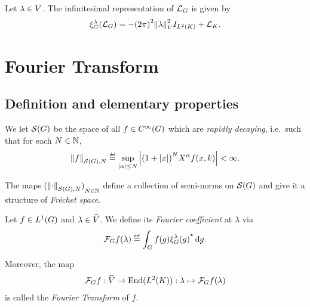 \begin{corollary}
\label{corollary:infinitesimal_representation_of_the_Laplacian}
    Let $\lambda \in \VectorSpace$.
    The infinitesimal representation of $\Laplacian$ is given by
    \begin{align*}
        \Rep{\lambda}(\Laplacian) = - {(\turn)}^2 \norm{\lambda}^2 \Id{\Lebesgue{2}{\CompactGroup}} + \Laplacian[\CompactGroup].
    \end{align*}
\end{corollary}

\section{Fourier Transform}

\subsection{Definition and elementary properties}

\begin{definition}
    We let $\Schwartz\Group$ be the space of all $f \in \SmoothFunctions\Group$
    which are \emph{rapidly decaying},
    i.e.\ such that for each $N \in \N$,
    \begin{align*}
        \seminorm[\Schwartz\Group]{N}{f} \defeq
        \sup_{\abs\alpha \leq N}
        \abs{%
            {(1 + \abs{x})}^N
            \LeftDifferentialOperator{\alpha} f(x, k)
        }
        < \infty.
    \end{align*}

    The maps ${(\seminorm[\Schwartz\Group]{N}{\dummy})}_{N \in \N}$ define a collection of semi-norms on $\Schwartz\Group$
    and give it a structure of \emph{Fr\'echet space}.
\end{definition}

\begin{definition}
\label{definition:Fourier_Transform}
    Let $f \in \Lebesgue{1}{\Group}$ and $\lambda \in \dualGroup{\VectorSpace}$.
    We define its \emph{Fourier coefficient} at $\lambda$ via
    \begin{align*}
        \Fourier{f}(\lambda) \defeq \int_\Group f(g) \adj{\Rep{\lambda}(g)} \dd g.
    \end{align*}

    Moreover, the map
    \begin{align*}
        \Fourier{f} : \dualGroup{\VectorSpace} \to \End(\Lebesgue{2}{\CompactGroup}) :
        \lambda \mapsto \Fourier{f}(\lambda)
    \end{align*}
    is called the \emph{Fourier Transform} of $f$.
\end{definition}

